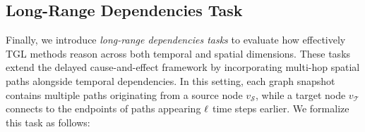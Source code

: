 \subsection{Long-Range Dependencies Task} \label{synth-benchmark:long}

  Finally, we introduce \emph{long-range dependencies tasks} to evaluate how effectively TGL methods reason across both temporal and spatial dimensions. These tasks extend the delayed cause-and-effect framework by incorporating multi-hop spatial paths alongside temporal dependencies. In this setting, each graph snapshot contains multiple paths originating from a source node \(v_{\mathcal S}\), while a target node \(v_{\mathcal T}\) connects to the endpoints of paths appearing \(\ell\) time steps earlier. We formalize this task as follows:
 
